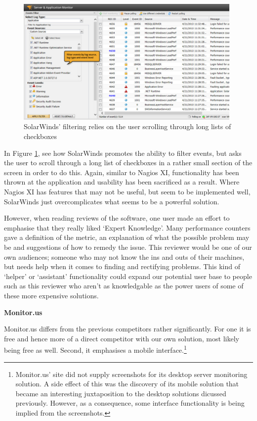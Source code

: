 \documentclass{l3proj}
\begin{document}
\begin{figure}[H]
\centering
\includegraphics[width=110mm]{Competitors/SolarWinds_EventFiltering.jpg}
\caption{SolarWinds' filtering relies on the user scrolling through long lists of checkboxes}
\label{fig:SWFiltering}
\end{figure}

In Figure \ref{fig:SWFiltering}, see how SolarWinds promotes the ability to filter events, but asks the user to scroll through a long list of checkboxes in a rather small section of the screen in order to do this. Again, similar to Nagios XI, functionality has been thrown at the application and usability has been sacrificed as a result. Where Nagios XI has features that may not be useful, but seem to be implemented well, SolarWinds just overcomplicates what seems to be a powerful solution.

However, when reading reviews of the software, one user made an effort to emphasise that they really liked `Expert Knowledge'. Many performance counters gave a definition of the metric, an explanation of what the possible problem may be and suggestions of how to remedy the issue. This reviewer would be one of our own audiences; someone who may not know the ins and outs of their machines, but needs help when it comes to finding and rectifying problems. This kind of `helper' or `assistant' functionality could expand our potential user base to people such as this reviewer who aren't as knowledgable as the power users of some of these more expensive solutions.

\textbf{Monitor.us} \cite{monitorus}

Monitor.us differs from the previous competitors rather significantly. For one it is free and hence more of a direct competitor with our own solution, most likely being free as well. Second, it emphasises a mobile interface.\footnote{\raggedright{}Monitor.us' site did not supply screenshots for its desktop server monitoring solution. A side effect of this was the discovery of its mobile solution that became an interesting juxtaposition to the desktop solutions dicussed previously. However, as a consequence, some interface functionality is being implied from the screenshots.}
\end{document}
